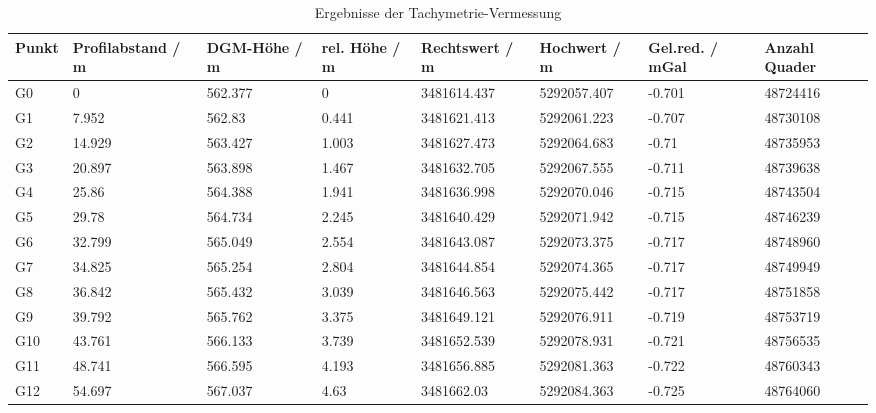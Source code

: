 \begin{landscape}
\begin{table}[!ht]
\centering
\caption{Ergebnisse der Tachymetrie-Vermessung}
\label{tab:tachy}
\begin{tabular}{llllllll}
\toprule
Punkt & Profilabstand / m & DGM-Höhe / m & rel. Höhe / m & Rechtswert / m & Hochwert / m & Gel.red. / mGal & Anzahl Quader \\
\midrule
G0    & 0                 & 562.377      & 0             & 3481614.437    & 5292057.407  & -0.701          & 48724416      \\
G1    & 7.952             & 562.83       & 0.441         & 3481621.413    & 5292061.223  & -0.707          & 48730108      \\
G2    & 14.929            & 563.427      & 1.003         & 3481627.473    & 5292064.683  & -0.71           & 48735953      \\
G3    & 20.897            & 563.898      & 1.467         & 3481632.705    & 5292067.555  & -0.711          & 48739638      \\
G4    & 25.86             & 564.388      & 1.941         & 3481636.998    & 5292070.046  & -0.715          & 48743504      \\
G5    & 29.78             & 564.734      & 2.245         & 3481640.429    & 5292071.942  & -0.715          & 48746239      \\
G6    & 32.799            & 565.049      & 2.554         & 3481643.087    & 5292073.375  & -0.717          & 48748960      \\
G7    & 34.825            & 565.254      & 2.804         & 3481644.854    & 5292074.365  & -0.717          & 48749949      \\
G8    & 36.842            & 565.432      & 3.039         & 3481646.563    & 5292075.442  & -0.717          & 48751858      \\
G9    & 39.792            & 565.762      & 3.375         & 3481649.121    & 5292076.911  & -0.719          & 48753719      \\
G10   & 43.761            & 566.133      & 3.739         & 3481652.539    & 5292078.931  & -0.721          & 48756535      \\
G11   & 48.741            & 566.595      & 4.193         & 3481656.885    & 5292081.363  & -0.722          & 48760343      \\
G12   & 54.697            & 567.037      & 4.63          & 3481662.03     & 5292084.363  & -0.725          & 48764060      \\

\end{tabular}
\end{table}
\end{landscape}
